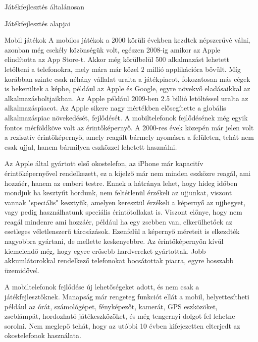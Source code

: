 \begin{MyChapter}{Játékfejlesztés általánosan}
\begin{MySection}{Játékfejlesztés alapjai}
		\begin{MySubSection}{Mobil játékok}
		A mobilos játékok a 2000 körüli években kezdtek népszerűvé válni, azonban még csekély közönségük volt, egészen 2008-ig amikor az Apple elindította az App Store-t. Akkor még körülbelül 500 alkalmazást lehetett letölteni a telefonokra, mely mára már közel 2 millió applikációra bővült.
		\cite{app_store_wiki}
		Míg korábban szinte csak néhány vállalat uralta a játékpiacot, fokozatosan más cégek is bekerültek a képbe, például az Apple és Google, egyre növekvő eladásaikkal az alkalmazásboltjaikban. Az Apple például 2009-ben 2.5 billió letöltéssel uralta az alkalmazáspiacot. Az Apple sikere nagy mértékben elősegítette a globális alkalmazáspiac növekedését, fejlődését.
		A mobiltelefonok fejlődésének még egyik fontos mérföldköve volt az érintőképernyő. A 2000-res évek közepén már jelen volt a rezisztív érintőképernyő, amely reagált bármely nyomásra a felületen, tehát nem csak ujjal, hanem bármilyen eszközzel lehetett használni.
		\cite{mobil_app_market}
		\cite{smartphone}
		\cite{resistive_touchscreen}
		
		Az Apple által gyártott első okostelefon, az iPhone már kapacitív érintőképernyővel rendelkezett, ez a kijelző már nem minden eszközre reagál, ami hozzáér, hanem az emberi testre. Ennek a hátránya lehet, hogy hideg időben mondjuk ha kesztyűt hordunk, nem feltétlenül érzékeli az ujjunkat, viszont vannak "speciális" kesztyűk, amelyen keresztül érzékeli a képernyő az ujjhegyet, vagy pedig használhatunk speciális érintőtollakat is. 
		\cite{touchscreen}
		Viszont előnye, hogy nem reagál mindenre ami hozzáér, például ha egy zsebben van, elkerülhetőek az esetleges véletlenszerű tárcsázások.
		Ezenfelül a képernyő méreteit is elkezdték nagyobbra gyártani, de mellette keskenyebbre. Az érintőképernyőn kívül kiemelendő még, hogy egyre erősebb hardvereket gyártottak. Jobb akkumlátorokkal rendelkező telefonokat bocsátottak piacra, egyre hosszabb üzemidővel.
		
		A mobiltelefonok fejlődése új lehetőségeket adott, és nem csak a játékfejlesztőknek. Manapság már rengeteg funkciót ellát a mobil, helyettesítheti például az órát, számológépet, fényképezőt, kamerát, GPS eszközöket, zseblámpát, hordozható játékeszközöket, és még tengernyi dolgot fel lehetne sorolni. Nem meglepő tehát, hogy az utóbbi 10 évben kifejezetten elterjedt az okostelefonok használata.
		

\end{MySubSection}
\end{MySection}
\end{MyChapter}
